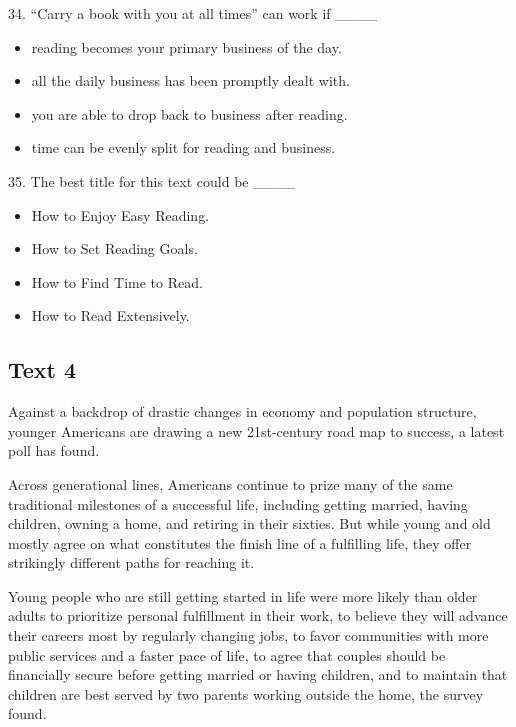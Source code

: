 \documentclass[UTF8,11pt]{ctexart}
\begin{document}
34. “Carry a book with you at all times” can work if \_\_\_\_


\begin{itemize}[leftmargin=2em,itemsep=.2em,topsep=.4em]\item[A.] reading becomes your primary business of the day.
\item[B.] all the daily business has been promptly dealt with.
\item[C.] you are able to drop back to business after reading.
\item[D.] time can be evenly split for reading and business.
\end{itemize}

35. The best title for this text could be \_\_\_\_


\begin{itemize}[leftmargin=2em,itemsep=.2em,topsep=.4em]\item[A.] How to Enjoy Easy Reading.
\item[B.] How to Set Reading Goals.
\item[C.] How to Find Time to Read.
\item[D.] How to Read Extensively.
\end{itemize}

\subsection*{\textbf{Text 4}}


Against a backdrop of drastic changes in economy and population structure, younger Americans are drawing a new 21st-century road map to success, a latest poll has found.


Across generational lines, Americans continue to prize many of the same traditional milestones of a successful life, including getting married, having children, owning a home, and retiring in their sixties. But while young and old mostly agree on what constitutes the finish line of a fulfilling life, they offer strikingly different paths for reaching it.


Young people who are still getting started in life were more likely than older adults to prioritize personal fulfillment in their work, to believe they will advance their careers most by regularly changing jobs, to favor communities with more public services and a faster pace of life, to agree that couples should be financially secure before getting married or having children, and to maintain that children are best served by two parents working outside the home, the survey found.
\end{document}
